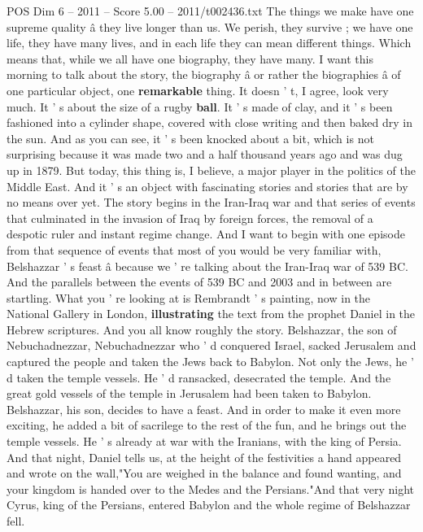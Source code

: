 \begin{textsample}{POS Dim 6 – 2011 – Score 5.00 – 2011/t002436.txt}  \label{ex:f6_pos_034}
The things we make have one supreme quality â they live longer than us.
We perish, they survive ; we have one life, they have many lives, and in each life they can mean different things.
Which means that, while we all have one biography, they have many.
I want this morning to talk about the story, the biography â or rather the biographies â of one particular object, one \textbf{remarkable} thing.
It doesn ' t, I agree, look very much.
It ' s about the size of a rugby \textbf{ball}.
It ' s made of clay, and it ' s been fashioned into a cylinder shape, covered with close writing and then baked dry in the sun.
And as you can see, it ' s been knocked about a bit, which is not surprising because it was made two and a half thousand years ago and was dug up in 1879.
But today, this thing is, I believe, a major player in the politics of the Middle East.
And it ' s an object with fascinating stories and stories that are by no means over yet.
The story begins in the Iran-Iraq war and that series of events that culminated in the invasion of Iraq by foreign forces, the removal of a despotic ruler and instant regime change.
And I want to begin with one episode from that sequence of events that most of you would be very familiar with, Belshazzar ' s feast â because we ' re talking about the Iran-Iraq war of 539 BC.
And the parallels between the events of 539 BC and 2003 and in between are startling.
What you ' re looking at is Rembrandt ' s painting, now in the National Gallery in London, \textbf{illustrating} the text from the prophet Daniel in the Hebrew scriptures.
And you all know roughly the story.
Belshazzar, the son of Nebuchadnezzar, Nebuchadnezzar who ' d conquered Israel, sacked Jerusalem and captured the people and taken the Jews back to Babylon.
Not only the Jews, he ' d taken the temple vessels.
He ' d ransacked, desecrated the temple.
And the great gold vessels of the temple in Jerusalem had been taken to Babylon.
Belshazzar, his son, decides to have a feast.
And in order to make it even more exciting, he added a bit of sacrilege to the rest of the fun, and he brings out the temple vessels.
He ' s already at war with the Iranians, with the king of Persia.
And that night, Daniel tells us, at the height of the festivities a hand appeared and wrote on the wall,"You are weighed in the balance and found wanting, and your kingdom is handed over to the Medes and the Persians."And that very night Cyrus, king of the Persians, entered Babylon and the whole regime of Belshazzar fell.

\end{textsample}
